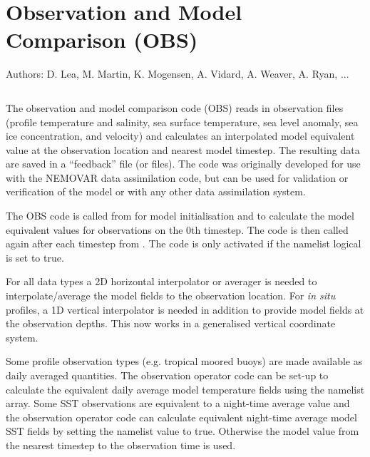 \documentclass[../tex_main/NEMO_manual]{subfiles}
\begin{document}
\chapter{Observation and Model Comparison (OBS)}
\label{chap:OBS}

Authors: D. Lea, M. Martin, K. Mogensen, A. Vidard, A. Weaver, A. Ryan, ...   %

\minitoc


\newpage
$\ $\newline    %

The observation and model comparison code (OBS) reads in observation files
(profile temperature and salinity, sea surface temperature, sea level anomaly, sea ice concentration, and velocity) and calculates an interpolated model equivalent value at the observation location and nearest model timestep.
The resulting data are saved in a ``feedback'' file (or files).
The code was originally developed for use with the NEMOVAR data assimilation code,
but can be used for validation or verification of the model or with any other data assimilation system.

The OBS code is called from  for model initialisation and to calculate the model equivalent values for observations on the 0th timestep.
The code is then called again after each timestep from .
The code is only activated if the namelist logical  is set to true.

For all data types a 2D horizontal interpolator or averager is needed to
interpolate/average the model fields to the observation location.
For {\em in situ} profiles, a 1D vertical interpolator is needed in addition to
provide model fields at the observation depths.
This now works in a generalised vertical coordinate system. 

Some profile observation types (e.g. tropical moored buoys) are made available as daily averaged quantities.
The observation operator code can be set-up to calculate the equivalent daily average model temperature fields using
the  namelist array.
Some SST observations are equivalent to a night-time average value and
the observation operator code can calculate equivalent night-time average model SST fields by
setting the namelist value  to true.
Otherwise the model value from the nearest timestep to the observation time is used.
\end{document}
